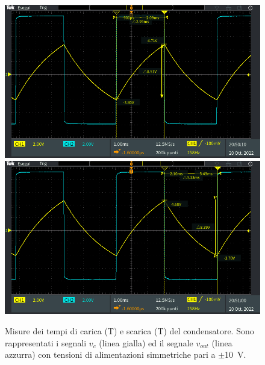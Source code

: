 \begin{figure}[h]
	\centering
	\includegraphics[width=0.496\linewidth]{./ImageFiles/Laboratorio 3/TEK00014.PNG}
	\includegraphics[width=0.496\linewidth]{./ImageFiles/Laboratorio 3/TEK00016.PNG}
	\caption{Misure dei tempi di carica (T) e scarica (T) del condensatore. Sono rappresentati i segnali $v_{c}$ (linea gialla) ed il segnale $v_{out}$ (linea azzurra) con tensioni di alimentazioni simmetriche pari a $\pm$\SI{10}{\volt}.}
	\label{fig:t1_t2_3}
\end{figure} 

